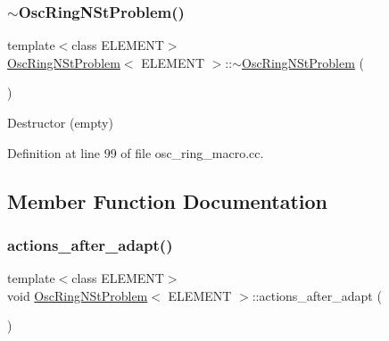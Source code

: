\mbox{\label{classOscRingNStProblem_a96e43adf75d4e33270218ceb3397443c}} 
\subsubsection{\texorpdfstring{$\sim$\+Osc\+Ring\+N\+St\+Problem()}{~OscRingNStProblem()}\hspace{0.1cm}{\footnotesize\ttfamily [2/2]}}
{\footnotesize\ttfamily template$<$class E\+L\+E\+M\+E\+NT$>$ \\
\hyperlink{classOscRingNStProblem}{Osc\+Ring\+N\+St\+Problem}$<$ E\+L\+E\+M\+E\+NT $>$\+::$\sim$\hyperlink{classOscRingNStProblem}{Osc\+Ring\+N\+St\+Problem} (\begin{DoxyParamCaption}{ }\end{DoxyParamCaption})\hspace{0.3cm}{\ttfamily [inline]}}



Destructor (empty) 



Definition at line 99 of file osc\+\_\+ring\+\_\+macro.\+cc.



\subsection{Member Function Documentation}
\mbox{\label{classOscRingNStProblem_a2dd1cb9b211f2cbd2ea9aea625685bcb}} 
\subsubsection{\texorpdfstring{actions\+\_\+after\+\_\+adapt()}{actions\_after\_adapt()}\hspace{0.1cm}{\footnotesize\ttfamily [1/2]}}
{\footnotesize\ttfamily template$<$class E\+L\+E\+M\+E\+NT$>$ \\
void \hyperlink{classOscRingNStProblem}{Osc\+Ring\+N\+St\+Problem}$<$ E\+L\+E\+M\+E\+NT $>$\+::actions\+\_\+after\+\_\+adapt (\begin{DoxyParamCaption}{ }\end{DoxyParamCaption})\hspace{0.3cm}{\ttfamily [inline]}}



